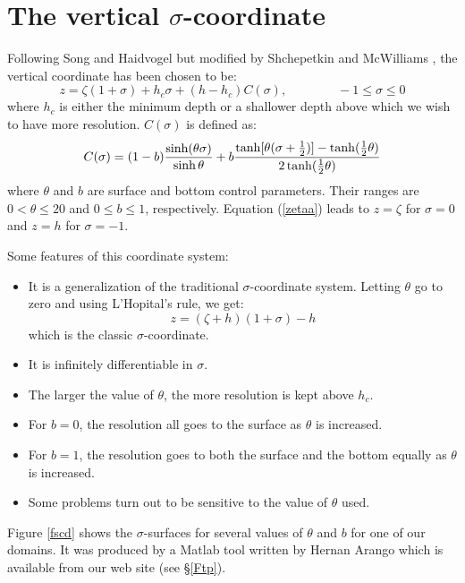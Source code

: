 \section{The vertical $\sigma$-coordinate}
\label{Scoord}

Following Song and Haidvogel \cite{Song94} but modified by
Shchepetkin and McWilliams \cite{SS2005}, the vertical coordinate has
been chosen to be:
\begin{equation}
   z = \zeta ( 1+\sigma) + h_c \sigma + (h - h_c) C(\sigma),
   \qquad \qquad -1 \leq \sigma \leq 0
\label{zetaa}
\end{equation}
where $h_c$ is either the minimum depth or a shallower depth above
which we wish to have more resolution.  $C(\sigma)$ is defined as:
\begin{equation}
   C(\sigma) = (1 - b) {\sinh (\theta \sigma) \over \sinh \theta } +
   b { \tanh [\theta ( \sigma + {1\over 2})] -
   \tanh ( {1\over 2} \theta) \over 
   2 \tanh ( {1\over 2} \theta) }
\end{equation}
where $\theta$ and $b$ are surface and bottom control parameters.
Their ranges are $0 < \theta \leq 20$ and $0 \leq b \leq 1$,
respectively.  Equation (\ref{zetaa}) leads to $z = \zeta$ for
$\sigma = 0$ and $z = h$ for $\sigma = -1$.

Some features of this coordinate system:
\begin{itemize}
   \item It is a generalization of the traditional $\sigma$-coordinate
   system.  Letting $\theta$ go to zero and using L'Hopital's rule,
   we get:
   \begin{equation}
      z = (\zeta + h)(1 + \sigma) - h
   \end{equation}
   which is the classic $\sigma$-coordinate.
   \item It is infinitely differentiable in $\sigma$.
   \item The larger the value of $\theta$, the more resolution is kept
   above $h_c$.
   \item For $b = 0$, the resolution all goes to the surface as
   $\theta$ is increased.
   \item For $b = 1$, the resolution goes to both the surface and the
   bottom equally as $\theta$ is increased.
   \item Some problems turn out to be sensitive to the value of
   $\theta$ used.
\end{itemize}
Figure \ref{fscd} shows the $\sigma$-surfaces for several values of $\theta$
and $b$ for one of our domains.  It was produced by a Matlab tool
written by Hernan Arango which is available from our web site (see
\S\ref{Ftp}).

